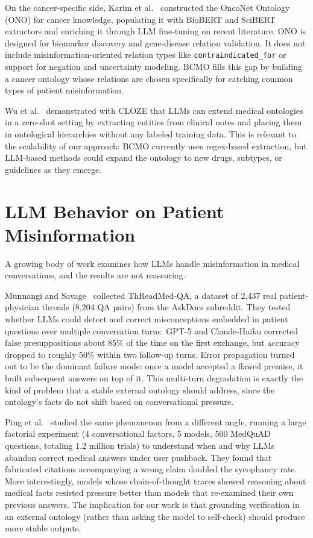 \documentclass[11pt,a4paper]{article}
\begin{document}
On the cancer-specific side, Karim et al.~\cite{karim2023onconet} constructed the OncoNet Ontology (ONO) for cancer knowledge, populating it with BioBERT and SciBERT extractors and enriching it through LLM fine-tuning on recent literature. ONO is designed for biomarker discovery and gene-disease relation validation. It does not include misinformation-oriented relation types like \texttt{contraindicated\_for} or support for negation and uncertainty modeling. BCMO fills this gap by building a cancer ontology whose relations are chosen specifically for catching common types of patient misinformation.

Wu et al.~\cite{wu2025cloze} demonstrated with CLOZE that LLMs can extend medical ontologies in a zero-shot setting by extracting entities from clinical notes and placing them in ontological hierarchies without any labeled training data. This is relevant to the scalability of our approach: BCMO currently uses regex-based extraction, but LLM-based methods could expand the ontology to new drugs, subtypes, or guidelines as they emerge.

\section{LLM Behavior on Patient Misinformation}

A growing body of work examines how LLMs handle misinformation in medical conversations, and the results are not reassuring.

Munnangi and Savage~\cite{munnangi2026threadmedqa} collected ThReadMed-QA, a dataset of 2,437 real patient-physician threads (8,204 QA pairs) from the AskDocs subreddit. They tested whether LLMs could detect and correct misconceptions embedded in patient questions over multiple conversation turns. GPT-5 and Claude-Haiku corrected false presuppositions about 85\% of the time on the first exchange, but accuracy dropped to roughly 50\% within two follow-up turns. Error propagation turned out to be the dominant failure mode: once a model accepted a flawed premise, it built subsequent answers on top of it. This multi-turn degradation is exactly the kind of problem that a stable external ontology should address, since the ontology's facts do not shift based on conversational pressure.

Ping et al.~\cite{ping2026sycophancy} studied the same phenomenon from a different angle, running a large factorial experiment (4 conversational factors, 5 models, 500 MedQuAD questions, totaling 1.2 million trials) to understand when and why LLMs abandon correct medical answers under user pushback. They found that fabricated citations accompanying a wrong claim doubled the sycophancy rate. More interestingly, models whose chain-of-thought traces showed reasoning about medical facts resisted pressure better than models that re-examined their own previous answers. The implication for our work is that grounding verification in an external ontology (rather than asking the model to self-check) should produce more stable outputs.
\end{document}
